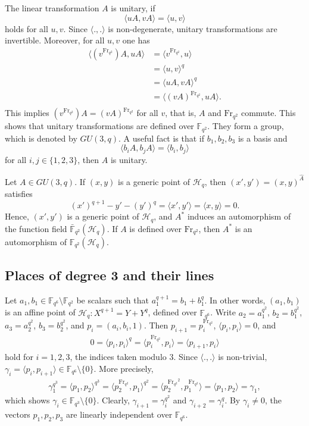 \documentclass[a4paper]{amsart}
\theoremstyle{plain}
\theoremstyle{definition}
\theoremstyle{remark}
\newcommand{\Frob}{{\mathrm{Fr}_{q^2}}}
\begin{document}
The linear transformation $A$ is unitary, if
\[\langle uA, vA \rangle = \langle u,v \rangle\]
holds for all $u,v$. Since $\langle .,. \rangle$ is non-degenerate, unitary transformations are invertible. Moreover, for all $u,v$ one has
\begin{align*}
\langle (v^\Frob)A, uA \rangle &= \langle v^\Frob,u \rangle \\
&= \langle u,v \rangle^q \\
&= \langle uA,vA \rangle^q \\
&= \langle (vA)^\Frob,uA \rangle. \\
\end{align*}
This implies $(v^\Frob)A = (vA)^\Frob$ for all $v$, that is, $A$ and $\Frob$ commute. This shows that unitary transformations are defined over $\mathbb{F}_{q^2}$. They form a group, which is denoted by $GU(3,q)$. A useful fact is that if $b_1,b_2,b_3$ is a basis and
\[\langle b_iA, b_jA \rangle = \langle b_i,b_j \rangle\]
for all $i,j\in \{1,2,3\}$, then $A$ is unitary. 

Let $A\in GU(3,q)$. If $(x,y)$ is a generic point of $\mathscr{H}_q$, then $(x',y')=(x,y)^{\hat{A}}$ satisfies 
\[(x')^{q+1}-y'-(y')^q=\langle x',y' \rangle = \langle x,y \rangle=0. \]
Hence, $(x',y')$ is a generic point of $\mathscr{H}_q$, and $A^*$ induces an automorphism of the function field $\bar{\mathbb{F}}_{q^2}(\mathscr{H}_q)$. If $A$ is defined over $\Frob$, then $A^*$ is an automorphism of $\mathbb{F}_{q^2}(\mathscr{H}_q)$. 



\subsection{Places of degree 3 and their lines} \label{ssec:places-lines}
Let $a_1,b_1 \in \mathbb{F}_{q^6}\setminus \mathbb{F}_{q^2}$ be scalars such that $a_1^{q+1}=b_1+b_1^q$. In other words, $(a_1,b_1)$ is an affine point of $\mathscr{H}_q:X^{q+1}=Y+Y^q$, defined over $\mathbb{F}_{q^6}$. Write $a_2=a_1^{q^2}$, $b_2=b_1^{q^2}$, $a_3=a_2^{q^2}$, $b_3=b_2^{q^2}$, and $p_i=(a_i,b_i,1)$. Then $p_{i+1}=p_i^\Frob$, $\langle p_i,p_i \rangle = 0$, and 
\begin{align*} %
0=\langle p_i,p_i \rangle ^q = \langle p_i^\Frob,p_i \rangle = \langle p_{i+1},p_i \rangle
\end{align*}
hold for $i=1,2,3$, the indices taken modulo $3$. Since $\langle .,. \rangle$ is non-trivial, $\gamma_i = \langle p_i,p_{i+1} \rangle \in \mathbb{F}_{q^6}\setminus \{0\}$. More precisely,
\begin{align*} %
\gamma_1^{q^3}=\langle p_1,p_{2} \rangle^{q^3} = \langle p_2^\Frob,p_{1} \rangle^{q^2} = \langle p_2^{\Frob^2},p_{1}^\Frob \rangle = \langle p_1,p_2 \rangle = \gamma_1,
\end{align*}
which shows $\gamma_i \in \mathbb{F}_{q^3}\setminus \{0\}$. Clearly, $\gamma_{i+1} = \gamma_i^{q^2}$ and $\gamma_{i+2} = \gamma_i^{q}$. By $\gamma_i\neq 0$, the vectors $p_1,p_2,p_3$ are linearly independent over $\mathbb{F}_{q^6}$. 
\end{document}
